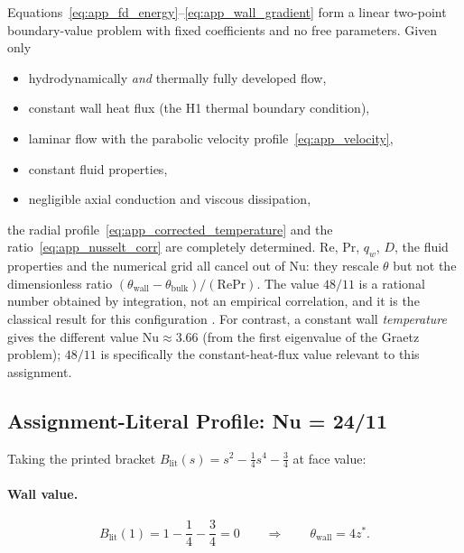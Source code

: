 \documentclass[12pt,a4paper]{article}
\newcommand{\Rey}{\text{Re}}
\newcommand{\Pran}{\text{Pr}}
\begin{document}
Equations~\eqref{eq:app_fd_energy}--\eqref{eq:app_wall_gradient} form a linear two-point
boundary-value problem with fixed coefficients and no free parameters. Given only
\begin{itemize}
    \item hydrodynamically \emph{and} thermally fully developed flow,
    \item constant wall heat flux (the H1 thermal boundary condition),
    \item laminar flow with the parabolic velocity profile~\eqref{eq:app_velocity},
    \item constant fluid properties,
    \item negligible axial conduction and viscous dissipation,
\end{itemize}
the radial profile~\eqref{eq:app_corrected_temperature} and the ratio~\eqref{eq:app_nusselt_corr}
are completely determined. $\Rey$, $\Pran$, $q_w$, $D$, the fluid properties and the numerical
grid all cancel out of $\text{Nu}$: they rescale $\theta$ but not the dimensionless ratio
$(\theta_{\text{wall}}-\theta_{\text{bulk}})/(\Rey\Pran)$. The value $48/11$ is a rational number
obtained by integration, not an empirical correlation, and it is the classical result for this
configuration \cite{ShahLondon1978,Incropera,KaysCrawford,BirdStewartLightfoot}. For contrast, a
constant wall \emph{temperature} gives the different value $\text{Nu}\approx3.66$ (from the first
eigenvalue of the Graetz problem); $48/11$ is specifically the constant-heat-flux value relevant
to this assignment.

\subsection{Assignment-Literal Profile: Nu = 24/11}

Taking the printed bracket $B_{\text{lit}}(s)=s^2-\tfrac14s^4-\tfrac34$ at face value:

\paragraph{Wall value.}
\begin{equation}
    B_{\text{lit}}(1) = 1-\frac14-\frac34 = 0
    \qquad\Longrightarrow\qquad
    \theta_{\text{wall}} = 4z^* .
\end{equation}
\end{document}
